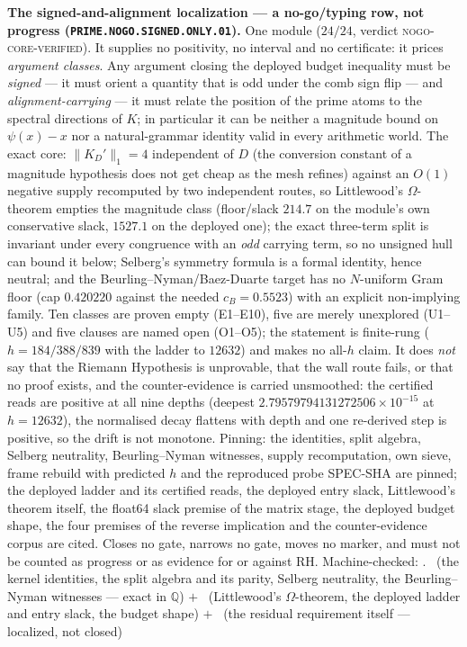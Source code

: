 \par\smallskip\noindent\textbf{The signed-and-alignment
localization --- a no-go/typing row, not progress
(\texttt{PRIME.NOGO.\allowbreak SIGNED.\allowbreak ONLY.01}).}
One module ($24/24$, verdict \textsc{nogo-core-verified}).  It
supplies no positivity, no interval and no certificate: it
prices \emph{argument classes}.  Any argument closing the
deployed budget inequality must be \emph{signed} --- it must
orient a quantity that is odd under the comb sign flip --- and
\emph{alignment-carrying} --- it must relate the position of the
prime atoms to the spectral directions of $K$; in particular it
can be neither a magnitude bound on $\psi(x) - x$ nor a
natural-grammar identity valid in every arithmetic world.  The
exact core: $\|K_D'\|_1 = 4$ independent of $D$ (the conversion
constant of a magnitude hypothesis does not get cheap as the
mesh refines) against an $O(1)$ negative supply recomputed by
two independent routes, so Littlewood's $\Omega$-theorem empties
the magnitude class (floor/slack $214.7$ on the module's own
conservative slack, $1527.1$ on the deployed one); the exact
three-term split is invariant under every congruence with an
\emph{odd} carrying term, so no unsigned hull can bound it
below; Selberg's symmetry formula is a formal identity, hence
neutral; and the Beurling--Nyman/Baez-Duarte target has no
$N$-uniform Gram floor (cap $0.420220$ against the needed
$c_B = 0.5523$) with an explicit non-implying family.  Ten
classes are proven empty (E1--E10), five are merely unexplored
(U1--U5) and five clauses are named open (O1--O5); the statement
is finite-rung ($h = 184/388/839$ with the ladder to $12632$)
and makes no all-$h$ claim.  It does \emph{not} say that the
Riemann Hypothesis is unprovable, that the wall route fails, or
that no proof exists, and the counter-evidence is carried
unsmoothed: the certified reads are positive at all nine depths
(deepest $2.79579794131272506\times10^{-15}$ at $h = 12632$),
the normalised decay flattens with depth and one re-derived step
is positive, so the drift is not monotone.  Pinning: the
identities, split algebra, Selberg neutrality,
Beurling--Nyman witnesses, supply recomputation, own sieve,
frame rebuild with predicted $h$ and the reproduced probe
SPEC-SHA are pinned; the deployed ladder and its certified
reads, the deployed entry slack, Littlewood's theorem itself,
the float64 slack premise of the matrix stage, the deployed
budget shape, the four premises of the reverse implication and
the counter-evidence corpus are cited.  Closes no gate, narrows
no gate, moves no marker, and must not be counted as progress or
as evidence for or against RH.
Machine-checked: .
\mE\ (the kernel identities, the split algebra and its parity,
Selberg neutrality, the Beurling--Nyman witnesses --- exact in
$\mathbb{Q}$) $+$ \mC\ (Littlewood's $\Omega$-theorem, the
deployed ladder and entry slack, the budget shape) $+$ \mO\ (the
residual requirement itself --- localized, not closed)
\par\smallskip


